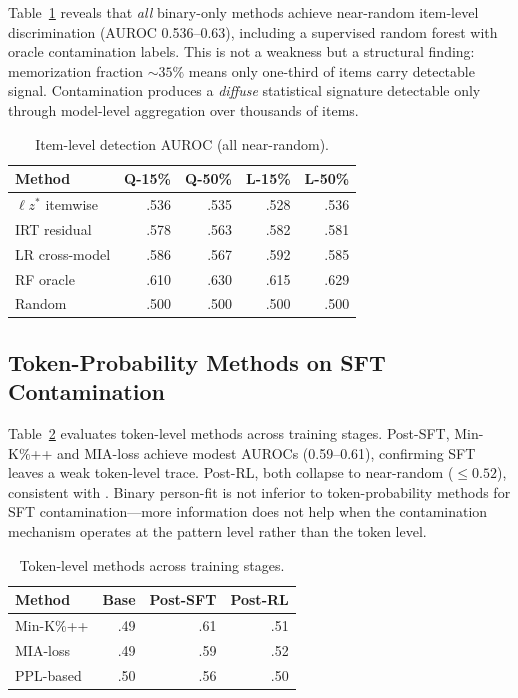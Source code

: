 \documentclass[11pt,twocolumn]{article}
\newcommand{\lzs}{\ensuremath{\ell z^*}}
\begin{document}
Table~\ref{tab:item_level} reveals that \emph{all} binary-only methods achieve near-random item-level discrimination (AUROC 0.536--0.63), including a supervised random forest with oracle contamination labels. This is not a weakness but a structural finding: memorization fraction ${\sim}35\%$ means only one-third of items carry detectable signal. Contamination produces a \emph{diffuse} statistical signature detectable only through model-level aggregation over thousands of items.

\begin{table}[t]
\centering
\caption{Item-level detection AUROC (all near-random).}
\label{tab:item_level}
\footnotesize
\begin{tabular}{lrrrr}
\toprule
Method & Q-15\% & Q-50\% & L-15\% & L-50\% \\
\midrule
$\lzs$ itemwise & .536 & .535 & .528 & .536 \\
IRT residual & .578 & .563 & .582 & .581 \\
LR cross-model & .586 & .567 & .592 & .585 \\
RF oracle & .610 & .630 & .615 & .629 \\
Random & .500 & .500 & .500 & .500 \\
\bottomrule
\end{tabular}
\vspace{-0.3cm}
\end{table}

\subsection{Token-Probability Methods on SFT Contamination}

Table~\ref{tab:token_methods} evaluates token-level methods across training stages. Post-SFT, Min-K\%++ and MIA-loss achieve modest AUROCs (0.59--0.61), confirming SFT leaves a weak token-level trace. Post-RL, both collapse to near-random ($\leq 0.52$), consistent with \citet{wang2025rlcontam}. Binary person-fit is not inferior to token-probability methods for SFT contamination---more information does not help when the contamination mechanism operates at the pattern level rather than the token level.

\begin{table}[t]
\centering
\caption{Token-level methods across training stages.}
\label{tab:token_methods}
\footnotesize
\begin{tabular}{lrrr}
\toprule
Method & Base & Post-SFT & Post-RL \\
\midrule
Min-K\%++ & .49 & .61 & .51 \\
MIA-loss & .49 & .59 & .52 \\
PPL-based & .50 & .56 & .50 \\
\bottomrule
\end{tabular}
\vspace{-0.3cm}
\end{table}
\end{document}
